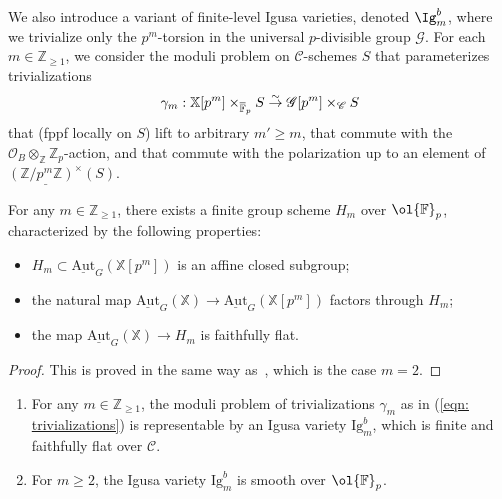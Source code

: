 \documentclass[letterpaper,11pt]{amsart}
\begin{document}
We also introduce a variant of finite-level Igusa varieties, denoted $\Ig^{b}_{m}$, where we trivialize only the $p^m$-torsion in the universal $p$-divisible group $\mathscr{G}$. For each $m\in \mathbb{Z}_{\geq 1}$, we consider the moduli problem on $\mathscr{C}$-schemes $S$ that parameterizes trivializations 
 \begin{equation}{\label{eqn: trivializations}}
 \gamma_m: \mathbb{X}[p^m]\times_{\overline{\mathbb{F}}_p} S \stackrel{\sim}{\to}
  \mathscr{G}[p^m]\times_{\mathscr{C}}S
 \end{equation}
 that (fppf locally on $S$) lift to arbitrary $m'\geq m$, that commute with the $\mathcal{O}_B\otimes_{\mathbb{Z}}\mathbb{Z}_p$-action, and that commute with the polarization up to an element of $\underline{(\mathbb{Z}/p^m\mathbb{Z})^\times}(S)$. 

\begin{lemma}\label{lem:automorphisms at level m} For any $m\in \mathbb{Z}_{\geq 1}$, there exists a finite group scheme $H_m$ over $\ol{\mathbb{F}}_p$, characterized by the following properties: 
\begin{itemize}
\item $H_m\subset \underline{\mathrm{Aut}}_G(\mathbb{X}[p^m])$ is an affine closed subgroup;
\item the natural map $ \underline{\mathrm{Aut}}_G(\mathbb{X})\to  \underline{\mathrm{Aut}}_G(\mathbb{X}[p^m])$ factors through $H_m$;
\item the map $ \underline{\mathrm{Aut}}_G(\mathbb{X})\to H_m$ is faithfully flat. 
\end{itemize}
\end{lemma}

\begin{proof}
    This is proved in the same way as~\cite[Lemma 5.5.3]{DAVH}, which is the case $m=2$. 
\end{proof}

\begin{lemma}\label{lem:representability}\leavevmode
\begin{enumerate}
\item For any $m\in \mathbb{Z}_{\geq 1}$, the moduli problem of trivializations $\gamma_m$ as in (\ref{eqn: trivializations}) is representable by an Igusa variety $\mathrm{Ig}^b_m$, which is finite and faithfully flat over $\mathscr{C}$. 
\item For $m\geq 2$, the Igusa variety $\mathrm{Ig}^b_m$ is smooth over $\ol{\mathbb{F}}_p$. 
\end{enumerate}
\end{lemma}
\end{document}

